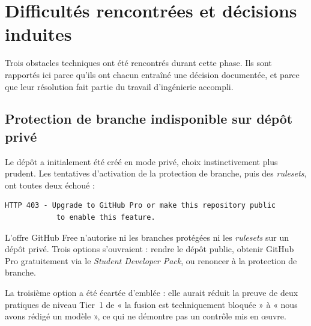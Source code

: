 
\section{Difficultés rencontrées et décisions induites}

Trois obstacles techniques ont été rencontrés durant cette phase. Ils sont
rapportés ici parce qu'ils ont chacun entraîné une décision documentée, et parce
que leur résolution fait partie du travail d'ingénierie accompli.

\subsection{Protection de branche indisponible sur dépôt privé}

Le dépôt a initialement été créé en mode privé, choix instinctivement plus
prudent. Les tentatives d'activation de la protection de branche, puis des
\emph{rulesets}, ont toutes deux échoué :

\begin{lstlisting}[numbers=none,basicstyle=\ttfamily\scriptsize]
HTTP 403 - Upgrade to GitHub Pro or make this repository public
            to enable this feature.
\end{lstlisting}

L'offre GitHub Free n'autorise ni les branches protégées ni les \emph{rulesets}
sur un dépôt privé. Trois options s'ouvraient : rendre le dépôt public, obtenir
GitHub Pro gratuitement via le \emph{Student Developer Pack}, ou renoncer à la
protection de branche.

La troisième option a été écartée d'emblée : elle aurait réduit la preuve de
deux pratiques de niveau Tier~1 de « la fusion est techniquement bloquée » à
« nous avons rédigé un modèle », ce qui ne démontre pas un contrôle mis en
œuvre.

